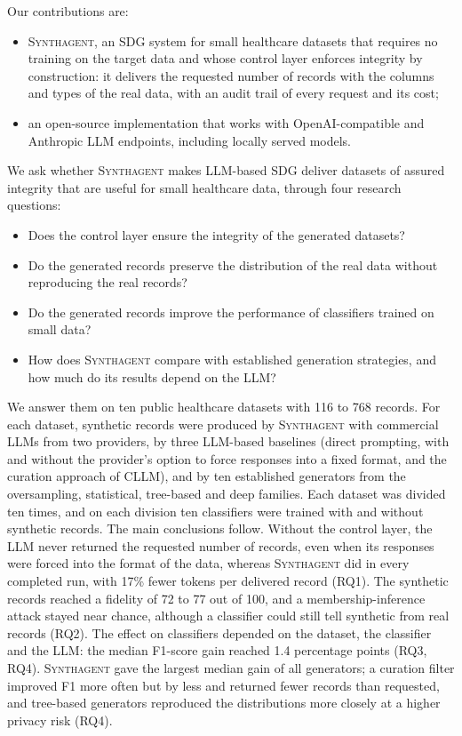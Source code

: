 \documentclass[conference]{IEEEtran}
\newcommand{\system}{\textsc{Synthagent}\xspace}
\newcommand{\resq}[1]{\textbf{RQ#1}}
\begin{document}
Our contributions are:
\begin{itemize}[leftmargin=*,itemsep=1pt]
  \item \system, an SDG system for small healthcare datasets that requires no training on the target data and whose control layer enforces integrity by construction: it delivers the requested number of records with the columns and types of the real data, with an audit trail of every request and its cost;
  \item an open-source implementation that works with OpenAI-compatible and Anthropic LLM endpoints, including locally served models.
\end{itemize}

We ask whether \system makes LLM-based SDG deliver datasets of assured integrity that are useful for small healthcare data, through four research questions:
\begin{itemize}[leftmargin=2.8em,labelsep=.5em,itemsep=1pt]
  \item[\resq{1}] Does the control layer ensure the integrity of the generated datasets?
  \item[\resq{2}] Do the generated records preserve the distribution of the real data without reproducing the real records?
  \item[\resq{3}] Do the generated records improve the performance of classifiers trained on small data?
  \item[\resq{4}] How does \system compare with established generation strategies, and how much do its results depend on the LLM?
\end{itemize}

We answer them on ten public healthcare datasets with 116 to 768 records. For each dataset, synthetic records were produced by \system with commercial LLMs from two providers, by three LLM-based baselines (direct prompting, with and without the provider's option to force responses into a fixed format, and the curation approach of CLLM), and by ten established generators from the oversampling, statistical, tree-based and deep families. Each dataset was divided ten times, and on each division ten classifiers were trained with and without synthetic records. The main conclusions follow. Without the control layer, the LLM never returned the requested number of records, even when its responses were forced into the format of the data, whereas \system did in every completed run, with 17\% fewer tokens per delivered record (RQ1). The synthetic records reached a fidelity of 72 to 77 out of 100, and a membership-inference attack stayed near chance, although a classifier could still tell synthetic from real records (RQ2). The effect on classifiers depended on the dataset, the classifier and the LLM: the median F1-score gain reached 1.4 percentage points (RQ3, RQ4). \system gave the largest median gain of all generators; a curation filter improved F1 more often but by less and returned fewer records than requested, and tree-based generators reproduced the distributions more closely at a higher privacy risk (RQ4).
\end{document}
